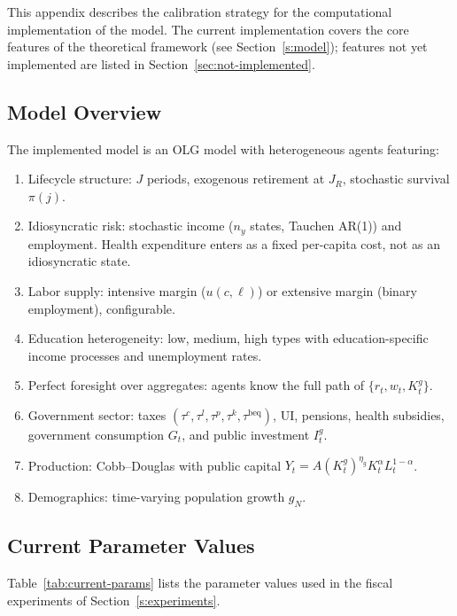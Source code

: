This appendix describes the calibration strategy for the computational implementation of the model. The current implementation covers the core features of the theoretical framework (see Section~\ref{s:model}); features not yet implemented are listed in Section~\ref{sec:not-implemented}.

\subsection{Model Overview}

The implemented model is an OLG model with heterogeneous agents featuring:
\begin{enumerate}
    \item Lifecycle structure: $J$ periods, exogenous retirement at $J_R$, stochastic survival $\pi(j)$.
    \item Idiosyncratic risk: stochastic income ($n_y$ states, Tauchen AR(1)) and employment. Health expenditure enters as a fixed per-capita cost, not as an idiosyncratic state.
    \item Labor supply: intensive margin ($u(c,\ell)$) or extensive margin (binary employment), configurable.
    \item Education heterogeneity: low, medium, high types with education-specific income processes and unemployment rates.
    \item Perfect foresight over aggregates: agents know the full path of $\{r_t, w_t, K_t^g\}$.
    \item Government sector: taxes $(\tau^c, \tau^l, \tau^p, \tau^k, \tau^{\text{beq}})$, UI, pensions, health subsidies, government consumption $G_t$, and public investment $I_t^g$.
    \item Production: Cobb--Douglas with public capital $Y_t = A(K_t^g)^{\eta_g} K_t^\alpha L_t^{1-\alpha}$.
    \item Demographics: time-varying population growth $g_N$.
\end{enumerate}

\subsection{Current Parameter Values}\label{sec:current-params}

Table~\ref{tab:current-params} lists the parameter values used in the fiscal experiments of Section~\ref{s:experiments}.


